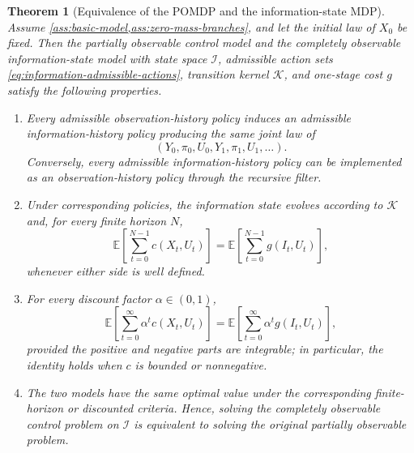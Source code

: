 \documentclass[10pt,twocolumn]{article}
\newtheorem{theorem}{Theorem}
\theoremstyle{remark}
\newcommand{\E}{\mathbb{E}}
\newcommand{\Ical}{\mathcal{I}}
\begin{document}
\begin{theorem}[Equivalence of the POMDP and the information-state MDP]
	\label{thm:pomdp-information-equivalence}
	Assume \cref{ass:basic-model,ass:zero-mass-branches}, and let the initial law of $X_0$ be fixed. Then the partially observable control model and the completely observable information-state model with state space $\Ical$, admissible action sets \cref{eq:information-admissible-actions}, transition kernel $\mathcal K$, and one-stage cost $g$ satisfy the following properties.
	
	\begin{enumerate}[label=\textnormal{(\roman*)},leftmargin=*]
		\item Every admissible observation-history policy induces an admissible information-history policy producing the same joint law of
		\[
		(Y_0,\pi_0,U_0,Y_1,\pi_1,U_1,\ldots).
		\]
		Conversely, every admissible information-history policy can be implemented as an observation-history policy through the recursive filter.
		
		\item Under corresponding policies, the information state evolves according to $\mathcal K$ and, for every finite horizon $N$,
		\begin{equation*}
			\E\!\left[\sum_{t=0}^{N-1}c(X_t,U_t)\right]
			=
			\E\!\left[\sum_{t=0}^{N-1}g(I_t,U_t)\right],
			\label{eq:finite-horizon-cost-equivalence}
		\end{equation*}
		whenever either side is well defined.
		
		\item For every discount factor $\alpha\in(0,1)$,
		\begin{equation*}
			\E\!\left[\sum_{t=0}^{\infty}\alpha^t c(X_t,U_t)\right]
			=
			\E\!\left[\sum_{t=0}^{\infty}\alpha^t g(I_t,U_t)\right],
			\label{eq:discounted-cost-equivalence}
		\end{equation*}
		provided the positive and negative parts are integrable; in particular, the identity holds when $c$ is bounded or nonnegative.
		
		\item The two models have the same optimal value under the corresponding finite-horizon or discounted criteria. Hence, solving the completely observable control problem on $\Ical$ is equivalent to solving the original partially observable problem.
	\end{enumerate}
\end{theorem}
\end{document}
